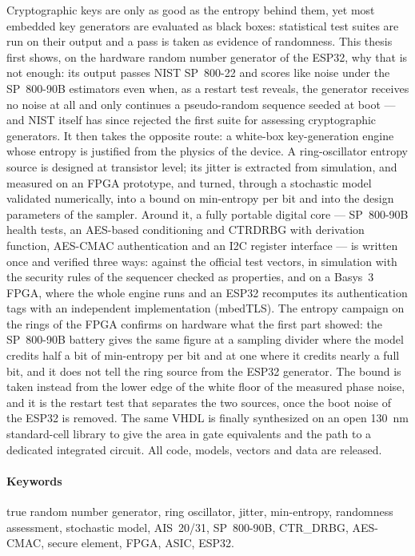 \documentclass[12pt, a4paper, oneside]{report}
\begin{document}
Cryptographic keys are only as good as the entropy behind them, yet most
embedded key generators are evaluated as black boxes: statistical test
suites are run on their output and a pass is taken as evidence of
randomness. This thesis first shows, on the hardware random number
generator of the ESP32, why that is not enough: its output passes NIST
SP~800-22 and scores like noise under the SP~800-90B estimators even
when, as a restart test reveals, the generator receives no noise at all
and only continues a pseudo-random sequence seeded at boot ---
and NIST itself has since rejected the first suite for assessing
cryptographic generators. It then takes the opposite route: a white-box
key-generation engine whose entropy
is justified from the physics of the device. A ring-oscillator entropy
source is designed at transistor level; its jitter is extracted from
simulation, and measured on an FPGA prototype, and turned, through a
stochastic model validated numerically, into a bound on min-entropy per bit
and into the design parameters of the sampler. Around it, a fully
portable digital core --- SP~800-90B health tests, an AES-based
conditioning and \acs{CTRDRBG} with derivation function, AES-CMAC
authentication and an \acs{I2C} register interface --- is written once
and verified three ways: against the official test vectors, in
simulation with the security rules of the sequencer checked as
properties, and on a Basys~3 FPGA, where the whole engine runs and an
ESP32 recomputes its authentication tags with an independent
implementation (mbedTLS). The entropy campaign on the rings of the FPGA
confirms on hardware what the first part showed: the SP~800-90B battery
gives the same figure at a sampling divider where the model credits half
a bit of min-entropy per bit and at one where it credits nearly a full
bit, and it does not tell the ring source from the ESP32 generator. The
bound is taken instead from the lower edge of the white floor of the
measured phase noise, and it is the restart test that separates the two
sources, once the boot noise of the ESP32 is removed. The same VHDL
is finally
synthesized on an open 130~nm standard-cell library to give the area in
gate equivalents and the path to a dedicated integrated circuit. All
code, models, vectors and data are released.

\paragraph{Keywords} true random number generator, ring oscillator,
jitter, min-entropy, randomness assessment, stochastic model, AIS~20/31,
SP~800-90B, CTR\_DRBG, AES-CMAC, secure element, FPGA, ASIC, ESP32.
\end{document}
